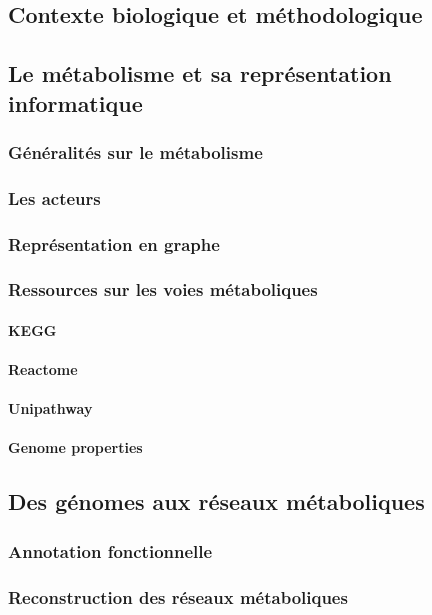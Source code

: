 \begin{refsection}
	\chapter{Contexte biologique et méthodologique }

\section{Le métabolisme et sa représentation informatique}
\subsection{Généralités sur le métabolisme}
\subsection{Les acteurs}
\subsection{Représentation en graphe}
\subsection{Ressources sur les voies métaboliques}
\subsubsection{KEGG}
\subsubsection{Reactome}
\subsubsection{Unipathway}
\subsubsection{Genome properties}

\section{Des génomes aux réseaux métaboliques}
\subsection{Annotation fonctionnelle}\label{subsect:annotation}
\subsection{Reconstruction des réseaux métaboliques}

\end{refsection}
